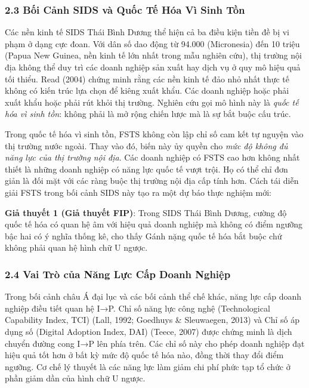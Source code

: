 \documentclass[12pt,a4paper]{article}
\begin{document}
\hypertarget{23-bux1ed1i-cux1ea3nh-sids-vuxe0-quux1ed1c-tux1ebf-huxf3a-vuxec-sinh-tux1ed3n}{%
\subsubsection{2.3 Bối Cảnh SIDS và Quốc Tế Hóa Vì Sinh
Tồn}\label{23-bux1ed1i-cux1ea3nh-sids-vuxe0-quux1ed1c-tux1ebf-huxf3a-vuxec-sinh-tux1ed3n}}

Các nền kinh tế SIDS Thái Bình Dương thể hiện cả ba điều kiện tiền đề bị
vi phạm ở dạng cực đoan. Với dân số dao động từ 94.000 (Micronesia) đến
10 triệu (Papua New Guinea, nền kinh tế lớn nhất trong mẫu nghiên cứu),
thị trường nội địa không thể duy trì các doanh nghiệp sản xuất hay dịch
vụ ở quy mô hiệu quả tối thiểu. Read (2004) chứng minh rằng các nền kinh
tế đảo nhỏ nhất thực tế không có kiến trúc lựa chọn để kiêng xuất khẩu.
Các doanh nghiệp hoặc phải xuất khẩu hoặc phải rút khỏi thị trường.
Nghiên cứu gọi mô hình này là \emph{quốc tế hóa vì sinh tồn}: không phải
là mở rộng chiến lược mà là sự bắt buộc cấu trúc.

Trong quốc tế hóa vì sinh tồn, FSTS không còn lập chỉ số cam kết tự
nguyện vào thị trường nước ngoài. Thay vào đó, biến này ủy quyền cho
\emph{mức độ không đủ năng lực của thị trường nội địa}. Các doanh nghiệp
có FSTS cao hơn không nhất thiết là những doanh nghiệp có năng lực quốc
tế vượt trội. Họ có thể chỉ đơn giản là đối mặt với các ràng buộc thị
trường nội địa cấp tính hơn. Cách tái diễn giải FSTS trong bối cảnh SIDS
này tạo ra một dự báo thực nghiệm mới:

\textbf{Giả thuyết 1 (Giả thuyết FIP)}: Trong SIDS Thái Bình Dương,
cường độ quốc tế hóa có quan hệ âm với hiệu quả doanh nghiệp mà không có
điểm ngưỡng bậc hai có ý nghĩa thống kê, cho thấy Gánh nặng quốc tế hóa
bắt buộc chứ không phải quan hệ hình chữ U ngược.

\hypertarget{24-vai-truxf2-cux1ee7a-nux103ng-lux1ef1c-cux1ea5p-doanh-nghiux1ec7p}{%
\subsubsection{2.4 Vai Trò của Năng Lực Cấp Doanh
Nghiệp}\label{24-vai-truxf2-cux1ee7a-nux103ng-lux1ef1c-cux1ea5p-doanh-nghiux1ec7p}}

Trong bối cảnh châu Á đại lục và các bối cảnh thể chế khác, năng lực cấp
doanh nghiệp điều tiết quan hệ I→P. Chỉ số năng lực công nghệ
(Technological Capability Index, TCI) (Lall, 1992; Goedhuys \&
Sleuwaegen, 2013) và Chỉ số áp dụng số (Digital Adoption Index, DAI)
(Teece, 2007) được chứng minh là dịch chuyển đường cong I→P lên phía
trên. Các chỉ số này cho phép doanh nghiệp đạt hiệu quả tốt hơn ở bất kỳ
mức độ quốc tế hóa nào, đồng thời thay đổi điểm ngưỡng. Cơ chế lý thuyết
là các năng lực làm giảm chi phí phức tạp tổ chức ở phần giảm dần của
hình chữ U ngược.
\end{document}
